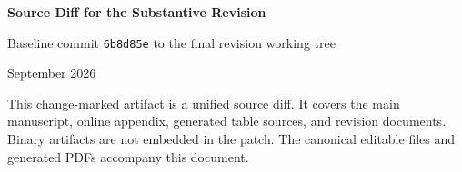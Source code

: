 \documentclass[9pt,letterpaper]{article}
\begin{document}
\begin{center}
{\Large\bfseries Source Diff for the Substantive Revision}\par
\vspace{0.3em}
Baseline commit \texttt{6b8d85e} to the final revision working tree\par
\vspace{0.2em}
September 2026
\end{center}

This change-marked artifact is a unified source diff.  It covers the main manuscript, online appendix, generated table sources, and revision documents.  Binary artifacts are not embedded in the patch.  The canonical editable files and generated PDFs accompany this document.


\end{document}

